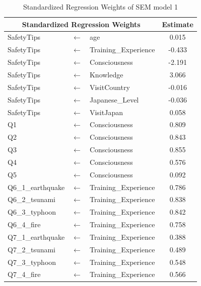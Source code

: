\begin{table}[h]
  \caption{Standardized Regression Weights of SEM model 1 }
  \label{table10}
  \centering
  \begin{tabular}{lcl|c}
 \hline
 \multicolumn{3}{c|}{Standardized Regression Weights} & Estimate  \\
 \hline
SafetyTips              &$\longleftarrow$ & age                  & 0.015  \\
SafetyTips              &$\longleftarrow$ & Training\_Experience & -0.433 \\
SafetyTips              &$\longleftarrow$ & Consciousness        & -2.191 \\
SafetyTips              &$\longleftarrow$ & Knowledge            & 3.066  \\
SafetyTips              &$\longleftarrow$ & VisitCountry         & -0.016 \\
SafetyTips              &$\longleftarrow$ & Japanese\_Level      & -0.036 \\
SafetyTips              &$\longleftarrow$ & VisitJapan           & 0.058  \\
Q1                      &$\longleftarrow$ & Consciousness        & 0.809  \\
Q2                      &$\longleftarrow$ & Consciousness        & 0.843  \\
Q3                      &$\longleftarrow$ & Consciousness        & 0.855  \\
Q4                      &$\longleftarrow$ & Consciousness        & 0.576  \\
Q5                      &$\longleftarrow$ & Consciousness        & 0.092  \\
Q6\_1\_earthquake       &$\longleftarrow$ & Training\_Experience & 0.786  \\
Q6\_2\_tsunami          &$\longleftarrow$ & Training\_Experience & 0.838  \\
Q6\_3\_typhoon          &$\longleftarrow$ & Training\_Experience & 0.842  \\
Q6\_4\_fire             &$\longleftarrow$ & Training\_Experience & 0.758  \\
Q7\_1\_earthquake       &$\longleftarrow$ & Training\_Experience & 0.388  \\
Q7\_2\_tsunami          &$\longleftarrow$ & Training\_Experience & 0.489  \\
Q7\_3\_typhoon          &$\longleftarrow$ & Training\_Experience & 0.548  \\
Q7\_4\_fire             &$\longleftarrow$ & Training\_Experience & 0.566  \\

\end{tabular}
\end{table}
